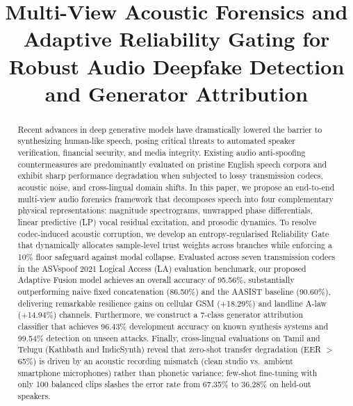 \documentclass[conference]{IEEEtran}
\begin{document}
\title{Multi-View Acoustic Forensics and Adaptive Reliability Gating for Robust Audio Deepfake Detection and Generator Attribution}

\author{
}

\maketitle

\begin{abstract}
Recent advances in deep generative models have dramatically lowered the barrier to synthesizing human-like speech, posing critical threats to automated speaker verification, financial security, and media integrity. Existing audio anti-spoofing countermeasures are predominantly evaluated on pristine English speech corpora and exhibit sharp performance degradation when subjected to lossy transmission codecs, acoustic noise, and cross-lingual domain shifts. In this paper, we propose an end-to-end multi-view audio forensics framework that decomposes speech into four complementary physical representations: magnitude spectrograms, unwrapped phase differentials, linear predictive (LP) vocal residual excitation, and prosodic dynamics. To resolve codec-induced acoustic corruption, we develop an entropy-regularised Reliability Gate that dynamically allocates sample-level trust weights across branches while enforcing a 10\% floor safeguard against modal collapse. Evaluated across seven transmission codecs in the ASVspoof 2021 Logical Access (LA) evaluation benchmark, our proposed Adaptive Fusion model achieves an overall accuracy of 95.56\%, substantially outperforming naive fixed concatenation (86.50\%) and the AASIST baseline (90.60\%), delivering remarkable resilience gains on cellular GSM (+18.29\%) and landline A-law (+14.94\%) channels. Furthermore, we construct a 7-class generator attribution classifier that achieves 96.43\% development accuracy on known synthesis systems and 99.54\% detection on unseen attacks. Finally, cross-lingual evaluations on Tamil and Telugu (Kathbath and IndicSynth) reveal that zero-shot transfer degradation (EER $>$ 65\%) is driven by an acoustic recording mismatch (clean studio vs.\ ambient smartphone microphones) rather than phonetic variance; few-shot fine-tuning with only 100 balanced clips slashes the error rate from 67.35\% to 36.28\% on held-out speakers.
\end{abstract}
\end{document}

